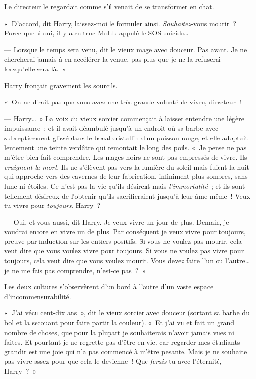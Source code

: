 Le directeur le regardait comme s'il venait de se transformer en chat.

«~D'accord, dit Harry, laissez-moi le formuler ainsi. \emph{Souhaitez}-vous mourir~? Parce que si oui, il y a ce truc Moldu appelé le SOS suicide…

--- Lorsque le temps sera venu, dit le vieux mage avec douceur. Pas avant. Je ne chercherai jamais à en accélérer la venue, pas plus que je ne la refuserai lorsqu'elle sera là.~»

Harry fronçait gravement les sourcils.

«~On ne dirait pas que vous avez une très grande volonté de vivre, directeur~!

--- Harry…~» La voix du vieux sorcier commençait à laisser entendre une légère impuissance~; et il avait déambulé jusqu'à un endroit où sa barbe avec subrepticement glissé dans le bocal cristallin d'un poisson rouge, et elle adoptait lentement une teinte verdâtre qui remontait le long des poils. «~Je pense ne pas m'être bien fait comprendre. Les mages noirs ne sont pas empressés de vivre. Ils \emph{craignent la mort}. Ils ne s'élèvent pas vers la lumière du soleil mais fuient la nuit qui approche vers des cavernes de leur fabrication, infiniment plus sombres, sans lune ni étoiles. Ce n'est pas la vie qu'ils désirent mais \emph{l'immortalité}~; et ils sont tellement désireux de l'obtenir qu'ils sacrifieraient jusqu'à leur âme même~! Veux-tu vivre pour \emph{toujours}, Harry~?

--- Oui, et vous aussi, dit Harry. Je veux vivre un jour de plus. Demain, je voudrai encore en vivre un de plus. Par conséquent je veux vivre pour toujours, preuve par induction sur les entiers positifs. Si vous ne voulez pas mourir, cela veut dire que vous voulez vivre pour toujours. Si vous ne voulez pas vivre pour toujours, cela veut dire que vous voulez mourir. Vous devez faire l'un ou l'autre… je ne me fais pas comprendre, n'est-ce pas~?~»

Les deux cultures s'observèrent d'un bord à l'autre d'un vaste espace d'incommensurabilité.

«~J'ai vécu cent-dix ans~», dit le vieux sorcier avec douceur (sortant sa barbe du bol et la secouant pour faire partir la couleur). «~Et j'ai vu et fait un grand nombre de choses, que pour la plupart je souhaiterais n'avoir jamais vues ni faites. Et pourtant je ne regrette pas d'être en vie, car regarder mes étudiants grandir est une joie qui n'a pas commencé à m'être pesante. Mais je ne souhaite pas vivre assez pour que cela le devienne~! Que \emph{ferais}-tu avec l'éternité, Harry~?~»

